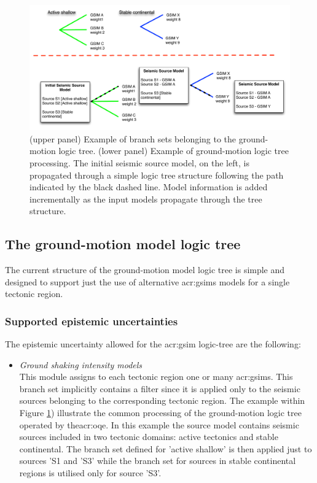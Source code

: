 %
\begin{figure}[!ht]
\centering
\includegraphics[width=\textwidth]{./Pictures/lts/logic_tree_gsim.pdf}
\caption{(upper panel) Example of branch sets belonging to the ground-motion 
logic tree. (lower panel) Example of ground-motion logic tree processing. 
The initial seismic source model, on the left,  is propagated through a simple 
logic tree structure following the path indicated by the black dashed line.
Model information is added incrementally as the input models propagate 
through the tree structure.}
\label{fig:logic_tree_gsim}
\end{figure}
%
%
\subsection{The ground-motion model logic tree}
The current structure of the ground-motion model logic tree is 
simple and designed to support just the use of alternative 
\glspl{acr:gsim} models for a single tectonic region.
%
\subsubsection{Supported epistemic uncertainties}
The epistemic uncertainty allowed for the \gls{acr:gsim} 
logic-tree are the following:
\begin{itemize}
    \item \emph{Ground shaking intensity models} \hfill \\
        This module assigns to each tectonic region one or many 
        \glspl{acr:gsim}. This branch set implicitly contains a 
        filter since it is applied only to the seismic sources 
        belonging to the corresponding tectonic region. The  
        example within Figure \ref{fig:logic_tree_gsim}) illustrate
        the common processing of the ground-motion logic tree operated
        by the\gls{acr:oqe}. In this example the source model 
        contains seismic sources included in two tectonic domains:
        active tectonics and stable continental. The branch set defined 
        for 'active shallow' is then applied just to sources 'S1 and 'S3' 
        while the branch set for sources in stable continental regions
        is utilised only for source 'S3'.
\end{itemize}
